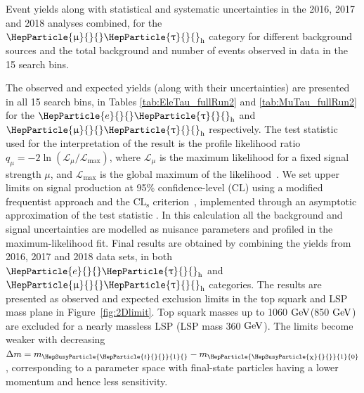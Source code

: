 \documentclass[12pt, a4paper]{article}
\newcommand{\GeV}{\ensuremath{\text{Ge\hspace{-.08em}V}}{}\xspace}
\DeclareRobustCommand{\PQt}{\HepParticle{t}{}{}} %
\DeclareRobustCommand{\Pe}{{\HepParticle{e}{}{}}\xspace} %
\DeclareRobustCommand{\PGm}{{\HepParticle{\upmu}{}{}}\xspace} %
\DeclareRobustCommand{\PGt}{{\HepParticle{\uptau}{}{}}\xspace} %
\DeclareRobustCommand{\PSQtDo}{{\HepSusyParticle{\PQt}{1}{}}\xspace}
\DeclareRobustCommand{\PSGc}{{\HepSusyParticle{\upchi}{}{}}\xspace} %
\DeclareRobustCommand{\PSGczDo}{{\HepParticle{\PSGc}{1}{0}}\xspace}
\newcommand{\tauh}{\ensuremath{\PGt_\mathrm{h}}\xspace}
\newcommand{\CLs}{\ensuremath{\text{CL}_\text{s}}\xspace}
\newcommand{\CL}{\ensuremath{\text{CL}}\xspace}
\begin{document}
\begin{table}
	\centering
	\caption{Event yields along with statistical and systematic uncertainties in the 2016, 2017 and 2018 analyses combined, for the $\PGm\tauh$ category for different background sources and the total background and number of events observed in data in the 15 search bins.}
	\small\addtolength{\tabcolsep}{-4pt}
	
	\label{tab:MuTau_fullRun2}
\end{table}
The observed and expected yields (along with their uncertainties) are presented in all 15 search bins, in Tables \ref{tab:EleTau_fullRun2} and \ref{tab:MuTau_fullRun2} for the $\Pe\tauh$ and $\PGm\tauh$ respectively.
The test statistic used for the interpretation of the result is the profile likelihood ratio $ q_{\mu} = -2 \ln{(\mathcal{L}_{\mu} / \mathcal{L}_{\text{max}})} $, where $ \mathcal{L}_{\mu} $ is the maximum likelihood for a fixed signal strength $ \mu $, and $ \mathcal{L}_{\text{max}} $ is the global maximum of the likelihood~\cite{CMS-NOTE-2011-005}. We set upper limits on signal production at 95\% confidence-level (\CL) using a modified frequentist approach and the \CLs criterion~\cite{JUNK1999435, Read_2002}, implemented through an asymptotic approximation of the test statistic \cite{Cowan2011}. In this calculation all the background and signal uncertainties are modelled as nuisance parameters and profiled in the maximum-likelihood fit. Final results are obtained by combining the yields from 2016, 2017 and 2018 data sets, in both $\Pe\tauh$ and $\PGm\tauh$ categories. The results are presented as observed and expected exclusion limits in the top squark and LSP mass plane in Figure~\ref{fig:2Dlimit}.
Top squark masses up to 1060 \GeV (850 \GeV) are excluded for a nearly massless LSP (LSP mass 360 \GeV). The limits become weaker with decreasing $ \Delta m = m_{\PSQtDo} - m_{\PSGczDo} $, corresponding to a parameter space with final-state particles having a lower momentum and hence less sensitivity.
\end{document}
